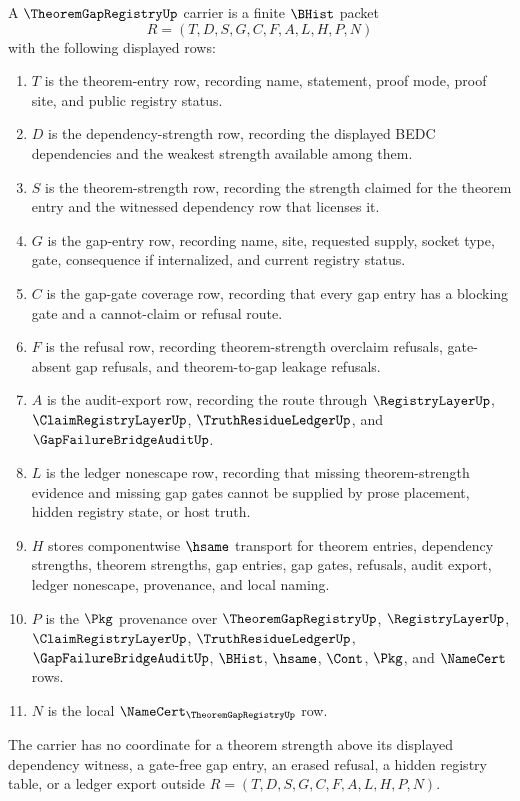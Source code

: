 \begin{definition}
\label{def:theorem-gap-registry-carrier}
A $\TheoremGapRegistryUp$ carrier is a finite $\BHist$ packet
$$
R=(T,D,S,G,C,F,A,L,H,P,N)
$$
with the following displayed rows:
\begin{enumerate}
\item $T$ is the theorem-entry row, recording name, statement, proof mode, proof site, and public registry status.
\item $D$ is the dependency-strength row, recording the displayed BEDC dependencies and the weakest strength available among them.
\item $S$ is the theorem-strength row, recording the strength claimed for the theorem entry and the witnessed dependency row that licenses it.
\item $G$ is the gap-entry row, recording name, site, requested supply, socket type, gate, consequence if internalized, and current registry status.
\item $C$ is the gap-gate coverage row, recording that every gap entry has a blocking gate and a cannot-claim or refusal route.
\item $F$ is the refusal row, recording theorem-strength overclaim refusals, gate-absent gap refusals, and theorem-to-gap leakage refusals.
\item $A$ is the audit-export row, recording the route through $\RegistryLayerUp$, $\ClaimRegistryLayerUp$, $\TruthResidueLedgerUp$, and $\GapFailureBridgeAuditUp$.
\item $L$ is the ledger nonescape row, recording that missing theorem-strength evidence and missing gap gates cannot be supplied by prose placement, hidden registry state, or host truth.
\item $H$ stores componentwise $\hsame$ transport for theorem entries, dependency strengths, theorem strengths, gap entries, gap gates, refusals, audit export, ledger nonescape, provenance, and local naming.
\item $P$ is the $\Pkg$ provenance over $\TheoremGapRegistryUp$, $\RegistryLayerUp$, $\ClaimRegistryLayerUp$, $\TruthResidueLedgerUp$, $\GapFailureBridgeAuditUp$, $\BHist$, $\hsame$, $\Cont$, $\Pkg$, and $\NameCert$ rows.
\item $N$ is the local $\NameCert_{\TheoremGapRegistryUp}$ row.
\end{enumerate}
The carrier has no coordinate for a theorem strength above its displayed dependency witness, a gate-free gap entry, an erased refusal, a hidden registry table, or a ledger export outside $R=(T,D,S,G,C,F,A,L,H,P,N)$.
\end{definition}

